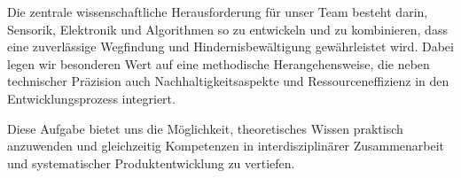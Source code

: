 \documentclass[main.tex]{subfiles} %
\begin{document}
Die zentrale wissenschaftliche Herausforderung für unser Team besteht darin,
Sensorik, Elektronik und Algorithmen so zu entwickeln und zu kombinieren, dass
eine zuverlässige Wegfindung und Hindernisbewältigung gewährleistet wird. Dabei
legen wir besonderen Wert auf eine methodische Herangehensweise, die neben
technischer Präzision auch Nachhaltigkeitsaspekte und Ressourceneffizienz in
den Entwicklungsprozess integriert.

Diese Aufgabe bietet uns die Möglichkeit, theoretisches Wissen praktisch
anzuwenden und gleichzeitig Kompetenzen in interdisziplinärer Zusammenarbeit
und systematischer Produktentwicklung zu vertiefen.
\end{document}
